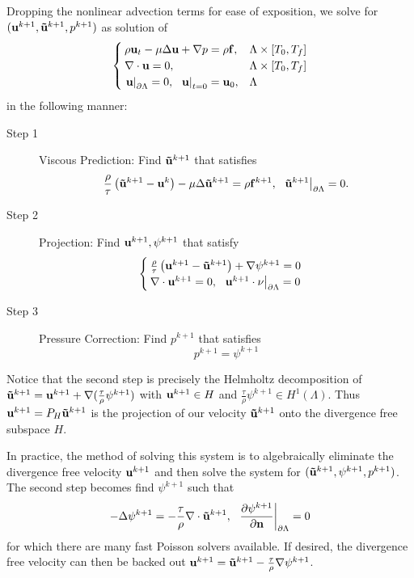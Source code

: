 \documentclass[letterpaper]{erdc}
\begin{document}
Dropping the nonlinear advection terms for ease of exposition, we solve for
$(\textbf{u}^{k+1}, \mathbf{\tilde{u}}^{k+1}, p^{k+1})$ as solution of
\begin{equation}
\begin{cases}
  \rho\textbf{u}_t - \mu\Delta\textbf{u} + \nabla p = \rho\mathbf{f},& \Lambda\times[T_0,T_f]\\
  \nabla\cdot \textbf{u} = 0,& \Lambda\times[T_0,T_f]\\
  \left.\textbf{u}\right|_{\partial\Lambda} = 0,\hspace{2mm} \left.\textbf{u}\right|_{t=0} = \textbf{u}_0,& \Lambda
\end{cases}
\end{equation}
in the following manner:
\begin{description}
  \item[Step 1] Viscous Prediction:  Find $\mathbf{\tilde{u}}^{k+1}$ that satisfies
  \begin{equation}
    \frac{\rho}{\tau}\left(\mathbf{\tilde{u}}^{k+1} - \textbf{u}^{k} \right) - \mu \Delta \mathbf{\tilde{u}}^{k+1} = \rho\mathbf{f}^{k+1},  \hspace{2mm} \left.\mathbf{\tilde{u}}^{k+1}\right|_{\partial\Lambda} = 0.
  \end{equation}
  
  \item[Step 2] Projection:  Find $\textbf{u}^{k+1}, \psi^{k+1}$ that satisfy
  \begin{equation}
    \begin{cases}
    \frac{\rho}{\tau}\left(\textbf{u}^{k+1} - \mathbf{\tilde{u}}^{k+1} \right) + \nabla \psi^{k+1} = 0 \\
    \nabla\cdot \textbf{u}^{k+1} = 0, \hspace{2mm} \left.\textbf{u}^{k+1}\cdot\nu\right|_{\partial\Lambda} = 0
    \end{cases}
  \end{equation}
  
  \item[Step 3] Pressure Correction: Find $p^{k+1}$ that satisfies
  \begin{equation}
    p^{k+1} = \psi^{k+1}
  \end{equation} 
\end{description}

Notice that the second step is precisely the Helmholtz decomposition of
$\mathbf{\tilde{u}}^{k+1} = \textbf{u}^{k+1} + \nabla(\frac{\tau}{\rho} \psi^{k+1})$ with
$\textbf{u}^{k+1}\in H$ and $\frac{\tau}{\rho}\psi^{k+1}\in H^1(\Lambda)$.  Thus
$\textbf{u}^{k+1} = P_{H}\mathbf{\tilde{u}}^{k+1}$ is the projection of our velocity $\mathbf{\tilde{u}}^{k+1}$ onto
the divergence free subspace $H$.

In practice, the method of solving this system is to algebraically eliminate
the divergence free velocity $\textbf{u}^{k+1}$ and then solve the system for
$(\mathbf{\tilde{u}}^{k+1},\psi^{k+1}, p^{k+1})$.  The second step becomes find $\psi^{k+1}$
such that
\begin{equation}
  -\Delta\psi^{k+1} = -\frac{\tau}{\rho} \nabla\cdot \mathbf{\tilde{u}}^{k+1}, \hspace{2mm} \left.\frac{\partial \psi^{k+1}}{\partial\textbf{n}}\right|_{\partial\Lambda} = 0
\end{equation}
for which there are many fast Poisson solvers available. If desired, the
divergence free velocity can then be backed out
$\textbf{u}^{k+1} = \mathbf{\tilde{u}}^{k+1} -\frac{\tau}{\rho} \nabla\psi^{k+1}$.
\end{document}
